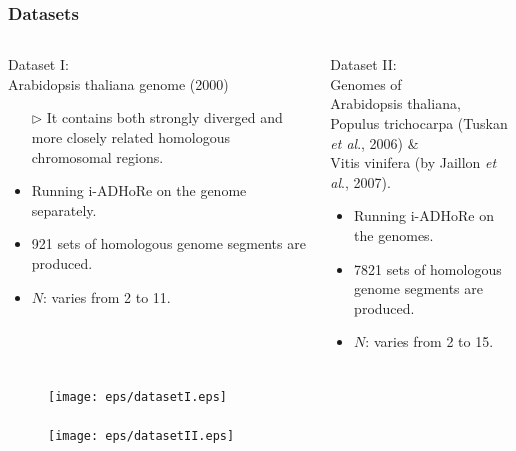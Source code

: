 \documentclass[xcolor=dvipsnames,envcountsect,handout]{beamer}
\begin{document}
\begin{frame}
\frametitle{Datasets}
\begin{columns}
\begin{column}[t]{6cm}
Dataset I: \\
{\footnotesize Arabidopsis thaliana genome (2000)}
\begin{small}
\begin{itemize}
\item [$\rhd$] It contains both strongly diverged and more closely
related homologous chromosomal regions.
\item Running i-ADHoRe on the genome separately. 
\item 921 sets of homologous genome segments are produced. 
\item $N$: varies from 2 to 11. 
\end{itemize}
\end{small}
\end{column}
\begin{column}[t]{6cm}
Dataset II: \\
{\footnotesize Genomes of \\
Arabidopsis thaliana, \\
Populus trichocarpa (Tuskan {\it et al}., 2006) \& \\
Vitis vinifera (by Jaillon {\it et al}., 2007).}
\begin{small}
\begin{itemize}
\item Running i-ADHoRe on the genomes. 
\item 7821 sets of homologous genome segments are produced. 
\item $N$: varies from 2 to 15.
\end{itemize}
\end{small}
\end{column}
\end{columns}
\end{frame}


\begin{frame}
\frametitle{}
\vspace{-8pt}
\begin{figure}[H]
\texttt{[image: eps/datasetI.eps]}
\end{figure}
\end{frame}


\begin{frame}
\frametitle{}
\begin{figure}[H]
\centering
\texttt{[image: eps/datasetII.eps]}
\end{figure}
\end{frame}
\end{document}
